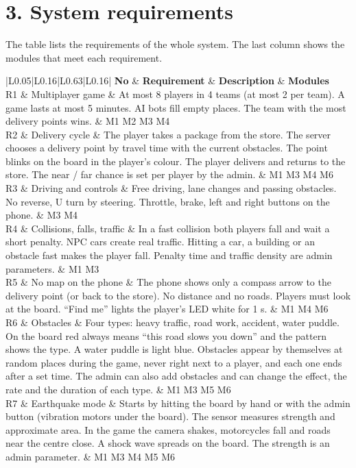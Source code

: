 \documentclass[
  english,
  10pt,
  a4paper,
]{article}
\newcommand{\ckkeep}[1]{\par\noindent\begin{minipage}{\linewidth}\setlength{\parskip}{4pt}#1\end{minipage}\par\smallskip}
\begin{document}
\section{3. System requirements}

\ckkeep{%
The table lists the requirements of the whole system. The last column shows the modules that meet
each requirement.

\begin{tabular}{|L{0.05}|L{0.16}|L{0.63}|L{0.16}|}
\hline \textbf{No} & \textbf{Requirement} & \textbf{Description} & \textbf{Modules} \\ \hline 
R1 & Multiplayer game & At most 8 players in 4 teams (at most 2 per team). A game lasts at most 5 minutes. AI bots fill empty places. The team with the most delivery points wins. & M1 M2 M3 M4 \\ \hline
R2 & Delivery cycle & The player takes a package from the store. The server chooses a delivery point by travel time with the current obstacles. The point blinks on the board in the player's colour. The player delivers and returns to the store. The near / far chance is set per player by the admin. & M1 M3 M4 M6 \\ \hline
R3 & Driving and controls & Free driving, lane changes and passing obstacles. No reverse, U turn by steering. Throttle, brake, left and right buttons on the phone. & M3 M4 \\ \hline
R4 & Collisions, falls, traffic & In a fast collision both players fall and wait a short penalty. NPC cars create real traffic. Hitting a car, a building or an obstacle fast makes the player fall. Penalty time and traffic density are admin parameters. & M1 M3 \\ \hline
R5 & No map on the phone & The phone shows only a compass arrow to the delivery point (or back to the store). No distance and no roads. Players must look at the board. ``Find me'' lights the player's LED white for 1 s. & M1 M4 M6 \\ \hline
R6 & Obstacles & Four types: heavy traffic, road work, accident, water puddle. On the board red always means ``this road slows you down'' and the pattern shows the type. A water puddle is light blue. Obstacles appear by themselves at random places during the game, never right next to a player, and each one ends after a set time. The admin can also add obstacles and can change the effect, the rate and the duration of each type. & M1 M3 M5 M6 \\ \hline
R7 & Earthquake mode & Starts by hitting the board by hand or with the admin button (vibration motors under the board). The sensor measures strength and approximate area. In the game the camera shakes, motorcycles fall and roads near the centre close. A shock wave spreads on the board. The strength is an admin parameter. & M1 M3 M4 M5 M6 \\ \hline

\end{tabular}}
\end{document}
